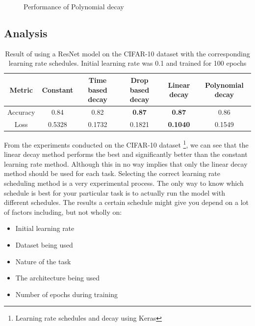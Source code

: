 \begin{figure}[!ht]
\begin{minipage}[b]{0.4\textwidth}
    \caption{Performance of Polynomial decay}
  \end{minipage}
\end{figure}

\subsection{Analysis}
\begin{table}[!ht]
    \centering
    \begin{tabular}{||c | c c c c c||}
         \hline Metric & Constant & Time based decay & Drop based decay & Linear decay & Polynomial decay \\ [0.5ex]
         \hline Accuracy & 0.84 & 0.82 & \textbf{0.87} & \textbf{0.87} & 0.86 \\
         \hline Loss & 0.5328 & 0.1732 & 0.1821 & \textbf{0.1040} & 0.1549 \\ [1ex]
         \hline
    \end{tabular}
    \caption{Result of using a ResNet model on the CIFAR-10 dataset with the corresponding learning rate schedules. Initial learning rate was 0.1 and trained for 100 epochs}
    \label{tab:my_label}
\end{table}

From the experiments conducted on the CIFAR-10 dataset \footnote{Learning rate schedules and decay using Keras}, we can see that the linear decay method performs the best and significantly better than the constant learning rate method. Although this in no way implies that only the linear decay method should be used for each task. Selecting the correct learning rate scheduling method is a very experimental process. The only way to know which schedule is best for your particular task is to actually run the model with different schedules. The results a certain schedule might give you depend on a lot of factors including, but not wholly on:
\begin{itemize}
    \item Initial learning rate
    \item Dataset being used
    \item Nature of the task
    \item The architecture being used
    \item Number of epochs during training
\end{itemize}

